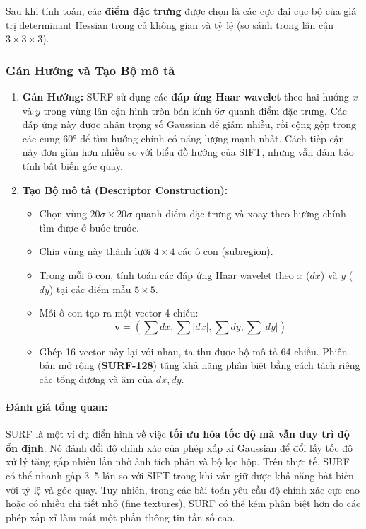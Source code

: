 Sau khi tính toán, các \textbf{điểm đặc trưng} được chọn là các cực đại cục bộ của giá trị determinant Hessian trong cả không gian và tỷ lệ (so sánh trong lân cận $3 \times 3 \times 3$).

\subsubsection{Gán Hướng và Tạo Bộ mô tả}
\label{subsubsec:surf_descriptor}
\begin{enumerate}
	\item \textbf{Gán Hướng:}  
	SURF sử dụng các \textbf{đáp ứng Haar wavelet} theo hai hướng $x$ và $y$ trong vùng lân cận hình tròn bán kính $6\sigma$ quanh điểm đặc trưng.  
	Các đáp ứng này được nhân trọng số Gaussian để giảm nhiễu, rồi cộng gộp trong các cung 60° để tìm hướng chính có năng lượng mạnh nhất.  
	Cách tiếp cận này đơn giản hơn nhiều so với biểu đồ hướng của SIFT, nhưng vẫn đảm bảo tính bất biến góc quay.
	
	\item \textbf{Tạo Bộ mô tả (Descriptor Construction):}
	\begin{itemize}
		\item Chọn vùng $20\sigma \times 20\sigma$ quanh điểm đặc trưng và xoay theo hướng chính tìm được ở bước trước.  
		\item Chia vùng này thành lưới $4 \times 4$ các ô con (subregion).  
		\item Trong mỗi ô con, tính toán các đáp ứng Haar wavelet theo $x$ ($dx$) và $y$ ($dy$) tại các điểm mẫu $5 \times 5$.  
		\item Mỗi ô con tạo ra một vector 4 chiều:
		\[
		\mathbf{v} = (\sum dx, \sum |dx|, \sum dy, \sum |dy|)
		\]
		\item Ghép 16 vector này lại với nhau, ta thu được bộ mô tả 64 chiều. Phiên bản mở rộng (\textbf{SURF-128}) tăng khả năng phân biệt bằng cách tách riêng các tổng dương và âm của $dx, dy$.
	\end{itemize}
\end{enumerate}

\paragraph{Đánh giá tổng quan:}  
SURF là một ví dụ điển hình về việc \textbf{tối ưu hóa tốc độ mà vẫn duy trì độ ổn định}.  
Nó đánh đổi độ chính xác của phép xấp xỉ Gaussian để đổi lấy tốc độ xử lý tăng gấp nhiều lần nhờ ảnh tích phân và bộ lọc hộp.  
Trên thực tế, SURF có thể nhanh gấp 3–5 lần so với SIFT trong khi vẫn giữ được khả năng bất biến với tỷ lệ và góc quay.  
Tuy nhiên, trong các bài toán yêu cầu độ chính xác cực cao hoặc có nhiều chi tiết nhỏ (fine textures), SURF có thể kém phân biệt hơn do các phép xấp xỉ làm mất một phần thông tin tần số cao.


